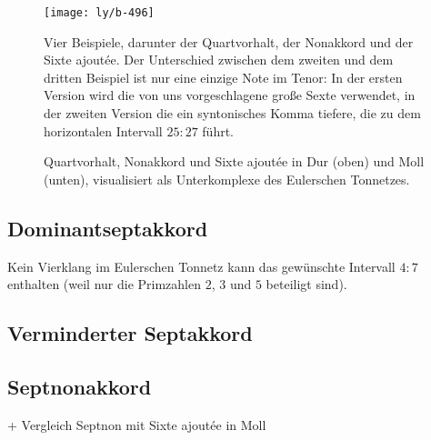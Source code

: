 \documentclass[british,11pt]{scrartcl}
\begin{document}
\begin{figure}
  \centering
  \texttt{[image: ly/b-496]}
  \caption{Vier Beispiele, darunter der Quartvorhalt, der Nonakkord und der
  	Sixte ajoutée. Der Unterschied zwischen dem zweiten und dem dritten Beispiel
  	ist nur eine einzige Note im Tenor: In der ersten Version wird die von uns
  	vorgeschlagene große Sexte verwendet, in der zweiten Version die ein
  	syntonisches Komma tiefere, die zu dem horizontalen Intervall $25:27$
  	führt.}\label{fig:496}
\end{figure}

\begin{figure}
  \centering
  
  \caption{Quartvorhalt, Nonakkord und Sixte ajoutée in Dur
    (oben) und Moll (unten), visualisiert als Unterkomplexe des Eulerschen
    Tonnetzes.}\label{fig:chordLines}
\end{figure}

\subsection{Dominantseptakkord}

Kein Vierklang im Eulerschen Tonnetz kann das gewünschte Intervall $4:7$
enthalten (weil nur die Primzahlen $2$, $3$ und $5$ beteiligt
sind).

\subsection{Verminderter Septakkord}


\subsection{Septnonakkord}

+ Vergleich Septnon mit Sixte ajoutée in Moll
\end{document}
